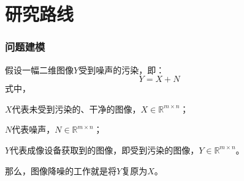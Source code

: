 \documentclass[10pt,aspectratio=43,mathserif]{beamer}
\begin{document}
\section[研究路线]{研究路线}
\begin{frame}
\frametitle{\textbf{问题建模}}
\par 假设一幅二维图像$Y$受到噪声的污染，即：
\begin{displaymath}
Y = X + N
\end{displaymath}
式中，
\par$X$代表未受到污染的、干净的图像，$X \in \mathbb{R}^{m \times n}$；
\par$N$代表噪声，$N \in \mathbb{R}^{m \times n}$；
\par$Y$代表成像设备获取到的图像，即受到污染的图像，$Y \in \mathbb{R}^{m \times n}$。
\newline
\par 那么，图像降噪的工作就是将$Y$复原为$X$。
\end{frame}
\end{document}
